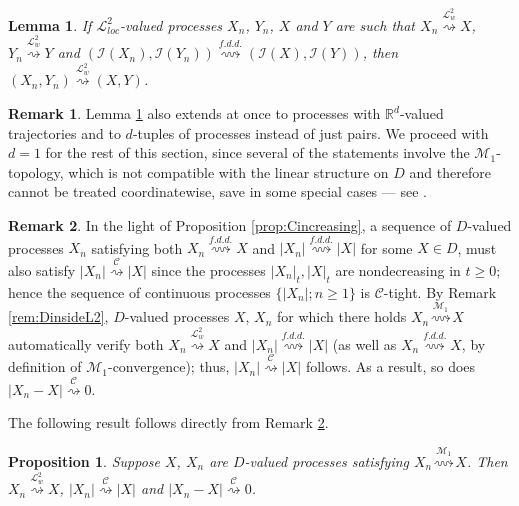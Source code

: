 \documentclass[final]{amsart}
\newtheorem{lem}[thm]{Lemma}
\newtheorem{prop}[thm]{Proposition}
\theoremstyle{definition}
\newtheorem{rem}{Remark}[section]
\numberwithin{equation}{section}
\newcommand{\dR}{\ensuremath{\mathbb{R}}}
\newcommand{\cI}{\ensuremath{\mathcal{I}}}
\newcommand{\cL}{\ensuremath{\mathcal{L}}}
\begin{document}
\begin{lem}\label{lem:lem_pairs}
If $\cL^2_{loc}$-valued processes $X_n$, $Y_n$, $X$ and $Y$ are such that
$X_n\stackrel{\cL^2_w}{\rightsquigarrow}X$, $Y_n \stackrel{\cL^2_w}{\rightsquigarrow}Y$ and
$\left( \cI(X_n) , \cI( Y_n) \right ) \stackrel{f.d.d.}{\rightsquigarrow}
\left( \cI(X)  , \cI(Y) \right )$,
then $(X_n,Y_n) \stackrel{\cL^2_w}{\rightsquigarrow} (X,Y)$.
\end{lem}

\begin{rem}\label{rem:RdExtension2}
Lemma \ref{lem:lem_pairs} also extends at once to processes with $\dR^d$-valued trajectories
and to $d$-tuples of processes instead of just pairs.
We proceed with $d=1$ for the rest of this section, since several of the statements involve the $\mathcal{M}_1$-topology,
which is not compatible with the linear structure on $D$ and therefore cannot be treated coordinatewise, save in some special cases
--- see \citet{Whitt:2002}.
\end{rem}

\begin{rem}\label{rem:L2normtightness}
In the light of Proposition \ref{prop:Cincreasing}, a sequence of $D$-valued processes $X_n$ satisfying both
$X_n \stackrel{f.d.d.}{\rightsquigarrow} X$ and $|X_n| \stackrel{f.d.d.}{\rightsquigarrow} |X|$ for some $X\in D$,
must also satisfy $|X_n|  \stackrel{\mathcal{C}}{\rightsquigarrow} |X|$ since the processes $|X_n|_t, |X|_t$ are nondecreasing in $t\ge 0$; hence
the sequence of continuous processes $\bigl\{|X_n|; n\ge1\bigr\}$ is $\mathcal{C}$-tight.
By Remark \ref{rem:DinsideL2}, $D$-valued processes $X$, $X_n$ for which there holds
$X_n \stackrel{\mathcal{M}_1}{\rightsquigarrow} X$ automatically verify both $X_n\stackrel{\cL^2_w}{\rightsquigarrow} X$ and
$|X_n| \stackrel{f.d.d.}{\rightsquigarrow} |X| $ (as well as $X_n \stackrel{f.d.d.}{\rightsquigarrow} X$, by definition of
$\mathcal{M}_1$-convergence); thus, $|X_n| \stackrel{\mathcal{C}}{\rightsquigarrow} |X|$ follows.
As a result, so does $|X_n-X| \stackrel{\mathcal{C}}{\rightsquigarrow} 0$.
\end{rem}

The following result follows directly from Remark \ref{rem:L2normtightness}.

\begin{prop}\label{prop:norm}
Suppose $X$, $X_n$ are  $D$-valued processes satisfying $X_n \stackrel{\mathcal{M}_1}{\rightsquigarrow} X$.
Then $X_n\stackrel{\cL^2_w}{\rightsquigarrow} X$, $|X_n| \stackrel{\mathcal{C}}{\rightsquigarrow} |X|$
and $|X_n-X|  \stackrel{\mathcal{C}}{\rightsquigarrow} 0$.
\end{prop}
\end{document}
